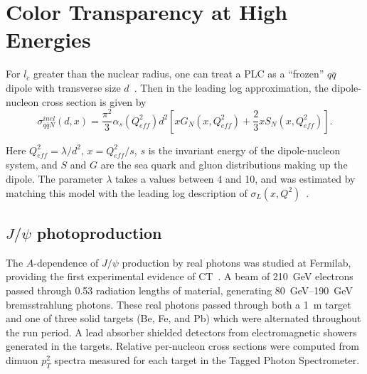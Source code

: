 \section{Color Transparency at High Energies}
\label{sec:ct_high_energies}

For $l_c$ greater than the nuclear radius, one can treat a PLC as a
``frozen'' $q\bar{q}$ dipole with transverse size
$d$~\cite{Blattel_1993, Frankfurt_1993}.
Then in the leading log approximation, the dipole-nucleon cross section is
given by~\cite{Frankfurt_2000, Frankfurt_2002}
\begin{equation} \label{eq:dipole_cross_section}
    \sigma_{q\bar{q} N}^{inel}(d,x) = \frac{\pi^{2}}{3} \alpha_{s}
    \left( Q_{eff}^2 \right) d^2
    \left[
           x G_{N} \left( x, Q_{eff}^2 \right) +
           \frac{2}{3} x S_{N} \left( x, Q_{eff}^2 \right)
    \right].
\end{equation}


Here $Q_{eff}^2=\lambda/d^2$, $x=Q_{eff}^2/s$, $s$ is the invariant energy of
the dipole-nucleon system, and $S$ and $G$ are the sea quark and gluon
distributions making up the dipole.
The parameter $\lambda$ takes a values between 4 and 10, and was estimated by
matching this model with the leading log description of
$\sigma_L(x,Q^2)$~\cite{Frankfurt_1996}.


\subsection{$J/\psi$ photoproduction}
%

The $A$-dependence of $J/\psi$ production by real photons was studied at
Fermilab, providing the first experimental evidence of CT~\cite{Sokoloff_1986}.
A beam of \SI{210}{\giga\electronvolt} electrons passed through 0.53 radiation
lengths of material, generating \SIrange{80}{190}{\giga\electronvolt} bremsstrahlung
photons.
These real photons passed through both a \SI{1}{\m}  target and one of
three solid targets (Be, Fe, and Pb) which were alternated throughout the run
period.
A lead absorber shielded detectors from electromagnetic showers generated in
the targets.
Relative per-nucleon cross sections were computed from dimuon $p_T^2$ spectra
measured for each target in the Tagged Photon Spectrometer.


